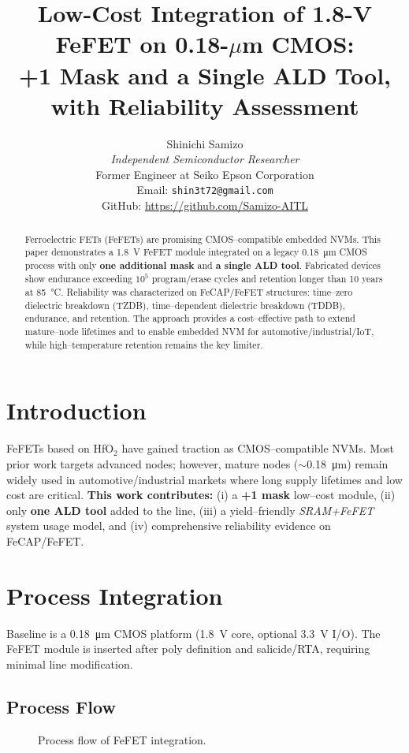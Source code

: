 \documentclass[conference]{IEEEtran}
\title{Low-Cost Integration of 1.8-V FeFET on 0.18-\(\mu\)m CMOS:\\
+1 Mask and a Single ALD Tool, with Reliability Assessment}
\author{%
Shinichi Samizo\\
\emph{Independent Semiconductor Researcher}\\
Former Engineer at Seiko Epson Corporation\\
Email: \texttt{shin3t72@gmail.com}\\
GitHub: \url{https://github.com/Samizo-AITL}
}
\begin{document}
\maketitle

\begin{abstract}
Ferroelectric FETs (FeFETs) are promising CMOS–compatible embedded NVMs.
This paper demonstrates a \SI{1.8}{V} FeFET module integrated on a legacy \SI{0.18}{\micro m} CMOS process with only \textbf{one additional mask} and \textbf{a single ALD tool}.
Fabricated devices show endurance exceeding \(10^{5}\) program/erase cycles and retention longer than 10 years at \SI{85}{\celsius}.
Reliability was characterized on FeCAP/FeFET structures: time–zero dielectric breakdown (TZDB), time–dependent dielectric breakdown (TDDB), endurance, and retention.
The approach provides a cost–effective path to extend mature–node lifetimes and to enable embedded NVM for automotive/industrial/IoT, while high–temperature retention remains the key limiter.
\end{abstract}

\section{Introduction}
FeFETs based on HfO\(_2\) have gained traction as CMOS–compatible NVMs.
Most prior work targets advanced nodes; however, mature nodes (\(\sim\)\SI{0.18}{\micro m}) remain widely used in automotive/industrial markets where long supply lifetimes and low cost are critical.
\textbf{This work contributes:}
(i) a \textbf{+1 mask} low–cost module,
(ii) only \textbf{one ALD tool} added to the line,
(iii) a yield–friendly \emph{SRAM+FeFET} system usage model, and
(iv) comprehensive reliability evidence on FeCAP/FeFET.

\section{Process Integration}
Baseline is a \SI{0.18}{\micro m} CMOS platform (\SI{1.8}{V} core, optional \SI{3.3}{V} I/O).
The FeFET module is inserted after poly definition and salicide/RTA, requiring minimal line modification.

\subsection{Process Flow}
\begin{figure}[t]
\centering
{}
\caption{Process flow of FeFET integration.}
\label{fig:proc_flow}
\end{figure}
\end{document}
